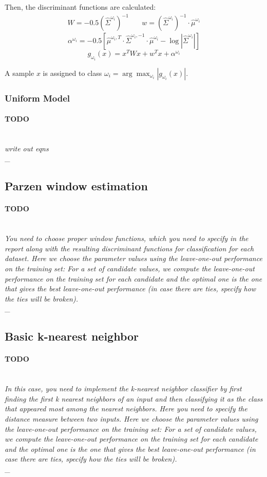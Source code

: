 \documentclass{article}
\newcommand{\wi}{\omega_i}
\newcommand{\hsigma}{\widehat \Sigma}
\newcommand{\hmu}{\hat \mu}
\newcommand{\outline}[2]{\paragraph{\textsc{#1}}\hrulefill~\\{\small\it #2}\\\_\hrulefill~\\}
\newcommand{\todo}[1]{\outline{\large TODO}{#1}}
\begin{document}
Then, the discriminant functions are calculated:
\begin{align*}
W = -0.5 \left( \hsigma^{\wi} \right)^{-1}
&~& w = \left( \hsigma^{\wi} \right)^{-1} \cdot \hmu^{\wi}
\end{align*}
$$\alpha^{\wi} = -0.5 \left[\hmu^{\wi, T} \cdot \hsigma^{\wi, -1} \cdot \hmu^{\wi} - \log \left| \hsigma^{\wi} \right| \right]$$
$$g_{\wi}(x) = x^T W x + w^T x + \alpha^{\wi}$$

A sample $x$ is assigned to class $\wi = \arg \max_{\wi} \left| g_{\wi}(x) \right|$.

\subsubsection{Uniform Model}
\todo{write out eqns}

\subsection{Parzen window estimation}
\todo{You need to choose proper window functions, which you need to specify in the report along with the resulting discriminant functions for classification for each dataset. Here we choose the parameter values using the leave-one-out performance on the training set: For a set of candidate values, we compute the leave-one-out performance on the training set for each candidate and the optimal one is the one that gives the best leave-one-out performance (in case there are ties, specify how the ties will be broken).}

\subsection{Basic k-nearest neighbor}
\todo{In this case, you need to implement the k-nearest neighbor classifier by first finding the first k nearest neighbors of an input and then classifying it as the class that appeared most among the nearest neighbors. Here you need to specify the distance measure between two inputs. Here we choose the parameter values using the leave-one-out performance on the training set: For a set of candidate values, we compute the leave-one-out performance on the training set for each candidate and the optimal one is the one that gives the best leave-one-out performance (in case there are ties, specify how the ties will be broken).}

\end{document}
